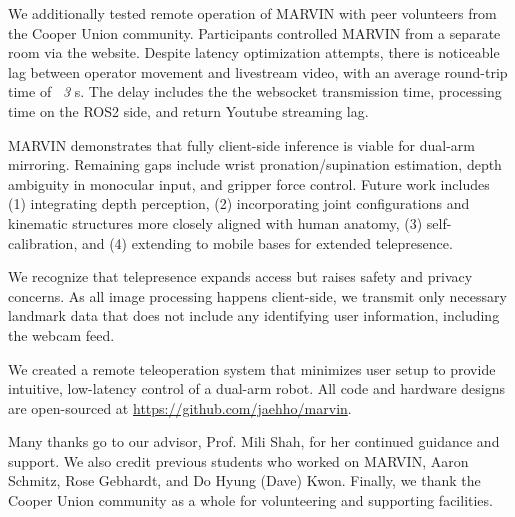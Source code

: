 \documentclass[acmsmall, screen]{acmart}
\begin{document}
We additionally tested remote operation of MARVIN with peer volunteers from the Cooper Union community. Participants controlled MARVIN from a separate room via the website. Despite latency optimization attempts, there is noticeable lag between operator movement and livestream video, with an average round-trip time of \textit{~3} s. The delay includes the the websocket transmission time, processing time on the ROS2 side, and return Youtube streaming lag.

MARVIN demonstrates that fully client-side inference is viable for dual-arm mirroring. Remaining gaps include wrist pronation/supination estimation, depth ambiguity in monocular input, and gripper force control. Future work includes (1) integrating depth perception, (2) incorporating joint configurations and kinematic structures more closely aligned with human anatomy, (3) self-calibration, and (4) extending to mobile bases for extended telepresence.

We recognize that telepresence expands access but raises safety and privacy concerns. As all image processing happens client-side, we transmit only necessary landmark data that does not include any identifying user information, including the webcam feed.

We created a remote teleoperation system that minimizes user setup to provide intuitive, low-latency control of a dual-arm robot. All code and hardware designs are open-sourced at \url{https://github.com/jaehho/marvin}.

\begin{acks}
Many thanks go to our advisor, Prof. Mili Shah, for her continued guidance and support. We also credit previous students who worked on MARVIN, Aaron Schmitz, Rose Gebhardt, and Do Hyung (Dave) Kwon. Finally, we thank the Cooper Union community as a whole for volunteering and supporting facilities.
\end{acks}



\end{document}
